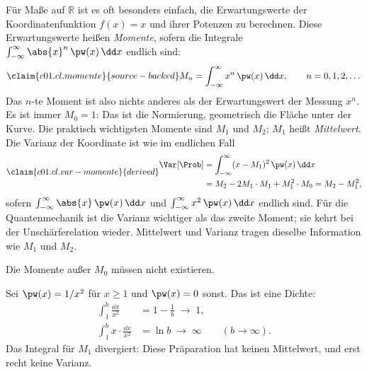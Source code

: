 Für Maße auf $\mathbb{R}$ ist es oft besonders einfach, die Erwartungswerte der
Koordinatenfunktion $f(x) = x$ und ihrer Potenzen zu berechnen. Diese Erwartungswerte heißen
\emph{Momente}, sofern die Integrale
$\int_{-\infty}^{\infty} \abs{x}^n\,\pw(x)\,\dd x$ endlich sind:
\begin{equation}\label{c01.eq.momente}\claim{c01.cl.momente}{source-backed}
  M_n = \int_{-\infty}^{\infty} x^n\, \pw(x)\,\dd x ,
  \qquad n = 0, 1, 2, \dots
\end{equation}
Das $n$-te Moment ist also nichts anderes als der Erwartungswert der Messung $x^n$. Es ist
immer $M_0 = 1$: Das ist die Normierung, geometrisch die Fläche unter der Kurve. Die
praktisch wichtigsten Momente sind $M_1$ und $M_2$; $M_1$ heißt \emph{Mittelwert}. Die Varianz der Koordinate ist wie im endlichen Fall
\begin{equation}\label{c01.eq.var-momente}\claim{c01.cl.var-momente}{derived}
  \begin{aligned}
    \Var[\Prob] &= \int_{-\infty}^{\infty} (x - M_1)^2\, \pw(x)\,\dd x \\
    &= M_2 - 2 M_1\cdot M_1 + M_1^2\cdot M_0 = M_2 - M_1^2 ,
  \end{aligned}
\end{equation}
sofern $\int_{-\infty}^{\infty} \abs{x}\,\pw(x)\,\dd x$ und
$\int_{-\infty}^{\infty} x^2\,\pw(x)\,\dd x$ endlich sind. Für die Quantenmechanik ist die Varianz wichtiger als
das zweite Moment; sie kehrt bei der Unschärferelation wieder. Mittelwert und Varianz
tragen dieselbe Information wie $M_1$ und $M_2$.

Die Momente außer $M_0$ müssen nicht existieren.

\begin{example}\label{c01.ex.kein-mittelwert}
  Sei $\pw(x) = 1/x^2$ für $x \geq 1$ und $\pw(x) = 0$ sonst. Das ist eine Dichte:
  \begin{equation}\label{c01.eq.kein-mittelwert}
    \begin{aligned}
      \int_1^{b} \frac{\dd x}{x^2} &= 1 - \frac{1}{b} \;\longrightarrow\; 1, \\
      \int_1^{b} x\cdot\frac{\dd x}{x^2} &= \ln b \;\longrightarrow\; \infty
      \qquad (b \to \infty) .
    \end{aligned}
  \end{equation}
  Das Integral für $M_1$ divergiert: Diese Präparation hat keinen Mittelwert, und erst
  recht keine Varianz.
\end{example}

